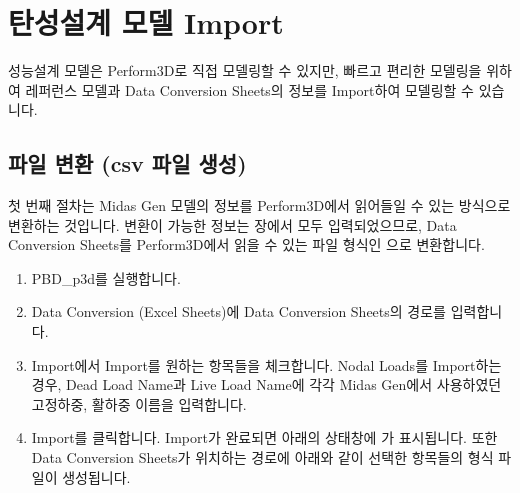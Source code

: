 \documentclass[a4paper,11pt,korean,openany,oneside]{sphinxmanual}
\begin{document}
\sphinxstepscope


\section{탄성설계 모델 Import}
\label{\detokenize{3_import:import}}\label{\detokenize{3_import::doc}}
\sphinxAtStartPar
성능설계 모델은 Perform\sphinxhyphen{}3D로 직접 모델링할 수 있지만,
빠르고 편리한 모델링을 위하여 레퍼런스 모델과 Data Conversion Sheets의 정보를 Import하여 모델링할 수 있습니다.


\subsection{파일 변환 (csv 파일 생성)}
\label{\detokenize{3_import:csv}}
\sphinxAtStartPar
첫 번째 절차는 Midas Gen 모델의 정보를 Perform\sphinxhyphen{}3D에서 읽어들일 수 있는 방식으로 변환하는 것입니다.
변환이 가능한 정보는 {\hyperref[\detokenize{1_material_setting::doc}]{}} 장에서 모두 입력되었으므로,
Data Conversion Sheets를 Perform\sphinxhyphen{}3D에서 읽을 수 있는 파일 형식인 으로 변환합니다.

\begin{sphinxShadowBox}
\begin{enumerate}
%
\item {} 
\sphinxAtStartPar
PBD\_p3d를 실행합니다.

\item {} 
\sphinxAtStartPar
Data Conversion (Excel Sheets)에 Data Conversion Sheets의 경로를 입력합니다.

\item {} 
\sphinxAtStartPar
Import에서 Import를 원하는 항목들을 체크합니다.
Nodal Loads를 Import하는 경우, Dead Load Name과 Live Load Name에 각각 Midas Gen에서 사용하였던 고정하중, 활하중 이름을 입력합니다.

\begin{center}
\noindent{}
\end{center}

\item {} 
\sphinxAtStartPar
Import를 클릭합니다. Import가 완료되면 아래의 상태창에 가 표시됩니다.
또한 Data Conversion Sheets가 위치하는 경로에 아래와 같이 선택한 항목들의  형식 파일이 생성됩니다.

\begin{center}
\noindent{}
\end{center}

\end{enumerate}
\end{sphinxShadowBox}
\end{document}
